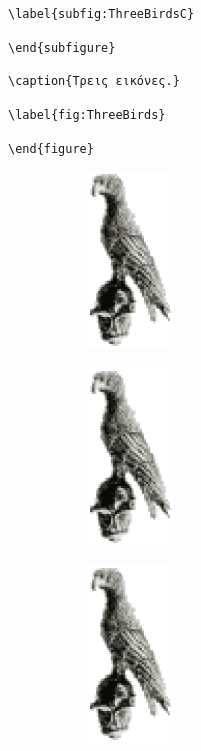 \noindent \bs\bs \verb$\label{subfig:ThreeBirdsC}$

\noindent \bs \verb$\end{subfigure}$

\noindent \bs \verb$\caption{Τρεις εικόνες.}$

\noindent \bs \verb$\label{fig:ThreeBirds}$

\noindent \verb$\end{figure}$

\begin{figure}[t]
	\centering
	\begin{subfigure}[t]{0.3\textwidth}
		\centering
		\includegraphics[width=0.25\textwidth]{Figures/bird.eps}
		\caption{}
		\label{subfig:ThreeBirdsA}
	\end{subfigure}
	\hfill
	\begin{subfigure}[t]{0.3\textwidth}
		\centering
		\includegraphics[width=0.25\textwidth]{Figures/bird.eps}
		\caption{}
		\label{subfig:ThreeBirdsB}
	\end{subfigure}
	\hfill
	\begin{subfigure}[t]{0.3\textwidth}
		\centering
		\includegraphics[width=0.25\textwidth]{Figures/bird.eps}

\end{subfigure}
\end{figure}
